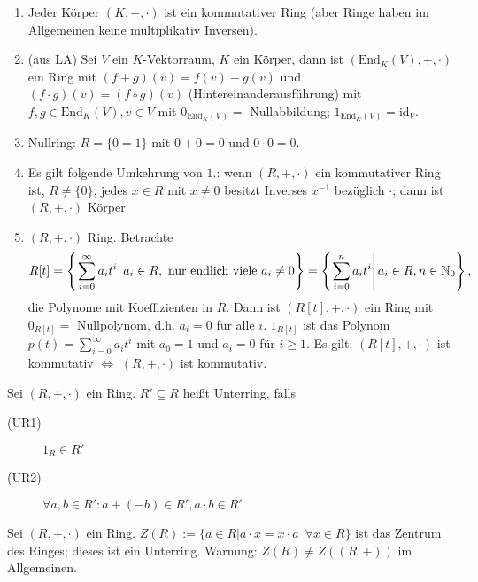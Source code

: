 \documentclass[12pt,a4paper]{scrartcl}
\begin{document}
\begin{bsp}
	\leavevmode
	\begin{enumerate}
		\item Jeder Körper $(K,+,\cdot)$ ist ein kommutativer Ring (aber Ringe haben im Allgemeinen keine multiplikativ Inversen).
		\item (aus LA) Sei $V$ ein $K$-Vektorraum, $K$ ein Körper, dann ist $(\text{End}_K(V),+,\cdot)$ ein Ring mit $(f+g)(v) = f(v)+g(v)$ und $(f\cdot g)(v) = (f\circ g)(v)$ (Hintereinanderausführung) mit $f,g\in \text{End}_K(V), v\in V$ mit $0_{\text{End}_K(V)} =$ Nullabbildung; $1_{\text{End}_K(V)} = \text{id}_V$.
		\item Nullring: $R = \{0=1\}$ mit $0+0 = 0$ und $0\cdot 0 = 0$.
		\item Es gilt folgende Umkehrung von $1.$: wenn $(R,+,\cdot)$ ein kommutativer Ring ist, $R\neq \{0\}$, jedes $x\in R$ mit $x\neq 0$ besitzt Inverses $x^{-1}$ bezüglich $\cdot$; dann ist $(R, +, \cdot )$ Körper
		\item $(R, +, \cdot)$ Ring. Betrachte
		\[ R[t] = \left\{ \left. \sum_{i=0}^{\infty} a_it^i \right| a_i\in R, \text{ nur endlich viele }a_i\neq 0\right\}  = \left\{\left. \sum_{i=0}^{n} a_it^i \right| a_i\in R, n\in \mathbb N_0\right\},\]
		die Polynome mit Koeffizienten in $R$. Dann ist $(R[t], +, \cdot)$ ein Ring mit $0_{R[t]} =$ Nullpolynom, d.h. $a_i = 0$ für alle $i$. $1_{R[t]}$ ist das Polynom $p(t) = \sum_{i = 0}^{\infty}a_it^i$ mit $a_0 = 1$ und $a_i = 0$ für $i\geq 1$.  Es gilt: $(R[t], +,\cdot)$ ist kommutativ $\Leftrightarrow$ $(R,+,\cdot)$ ist kommutativ.
	\end{enumerate}
\end{bsp}	

\begin{defi}
	Sei $(R,+,\cdot)$ ein Ring. $R'\subseteq R$ heißt Unterring, falls
	\begin{description}
		\item[(UR1)] $1_R\in R'$
		\item[(UR2)] $\forall a, b\in R': a+(-b)\in R', a\cdot b \in R'$
	\end{description}
\end{defi}

\begin{bsp}
	Sei $(R,+,\cdot)$ ein Ring. $Z(R) := \{a\in R|a\cdot x = x\cdot a \enspace \forall x\in R\}$ ist das Zentrum des Ringes; dieses ist ein Unterring. Warnung: $Z(R) \neq Z((R,+))$ im Allgemeinen.
\end{bsp}	
\end{document}
